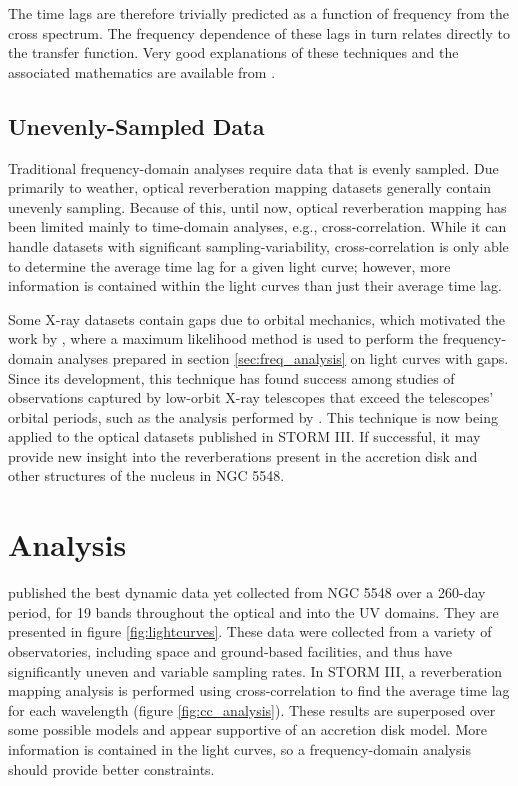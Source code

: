 \documentclass[11pt,letterpaper]{article}
\begin{document}
    The time lags are therefore trivially predicted as a function of frequency from the cross spectrum. The frequency dependence of these lags in turn relates directly to the transfer function. Very good explanations of these techniques and the associated mathematics are available from \cite{2014A&ARv..22...72U}.


	\subsection{Unevenly-Sampled Data}
    \label{sec:uneven_data}

    Traditional frequency-domain analyses require data that is evenly sampled. Due primarily to weather, optical reverberation mapping datasets generally contain unevenly sampling. Because of this, until now, optical reverberation mapping has been limited mainly to time-domain analyses, e.g., cross-correlation. While it can handle datasets with significant sampling-variability, cross-correlation is only able to determine the average time lag for a given light curve; however, more information is contained within the light curves than just their average time lag.

    Some X-ray datasets contain gaps due to orbital mechanics, which motivated the work by \cite{2013ApJ...777...24Z}, where a maximum likelihood method is used to perform the frequency-domain analyses prepared in section \ref{sec:freq_analysis} on light curves with gaps. Since its development, this technique has found success among studies of observations captured by low-orbit X-ray telescopes that exceed the telescopes' orbital periods, such as the analysis performed by \cite{2016Natur.535..388K}. This technique is now being applied to the optical datasets published in STORM III. If successful, it may provide new insight into the reverberations present in the accretion disk and other structures of the nucleus in NGC 5548.

\section{Analysis}
\label{analysis}
\cite{2016ApJ...821...56F} published the best dynamic data yet collected from NGC 5548 over a 260-day period, for 19 bands throughout the optical and into the UV domains. They are presented in figure \ref{fig:lightcurves}. These data were collected from a variety of observatories, including space and ground-based facilities, and thus have significantly uneven and variable sampling rates. In STORM III, a reverberation mapping analysis is performed using cross-correlation to find the average time lag for each wavelength (figure \ref{fig:cc_analysis}). These results are superposed over some possible models and appear supportive of an accretion disk model. More information is contained in the light curves, so a frequency-domain analysis should provide better constraints.
\end{document}
